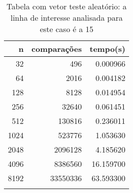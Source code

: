 \begin{table}[ht]
\centering
\begin{tabular}{rrr} \toprule
        n &    comparações &       tempo(s) \\ \midrule
      32  &            496 &      0.000966 \\
      64  &           2016 &      0.004182 \\
     128  &           8128 &      0.014954 \\
     256  &          32640 &      0.061451 \\
     512  &         130816 &      0.236011 \\
    1024  &         523776 &      1.053630 \\
    2048  &        2096128 &      4.185620 \\
    4096  &        8386560 &     16.159700 \\
    8192  &       33550336 &     63.593300 \\
\bottomrule\addlinespace
\end{tabular}
\caption{Tabela com vetor teste aleatório: a linha de interesse analisada para este caso é a 15}
\label{tab:bolhaAleatorio}
\end{table}
